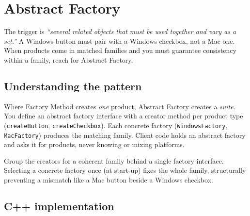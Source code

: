 \section{Abstract Factory}
\label{sec:pat-abstract-factory}


\begin{patternbox}
The trigger is \emph{``several related objects that must be used
together and vary as a set.''} A Windows button must pair with a Windows
checkbox, not a Mac one. When products come in matched families and you
must guarantee consistency within a family, reach for Abstract Factory.
\end{patternbox}

\subsection*{Understanding the pattern}

Where Factory Method creates \emph{one} product, Abstract Factory creates a
\emph{suite}. You define an abstract factory interface with a creator
method per product type (\texttt{createButton}, \texttt{createCheckbox}).
Each concrete factory (\texttt{WindowsFactory}, \texttt{MacFactory})
produces the matching family. Client code holds an abstract factory and
asks it for products, never knowing or mixing platforms.

\begin{ideabox}
Group the creators for a coherent family behind a single factory
interface. Selecting a concrete factory once (at start-up) fixes the whole
family, structurally preventing a mismatch like a Mac button beside a
Windows checkbox.
\end{ideabox}

\subsection*{C++ implementation}

